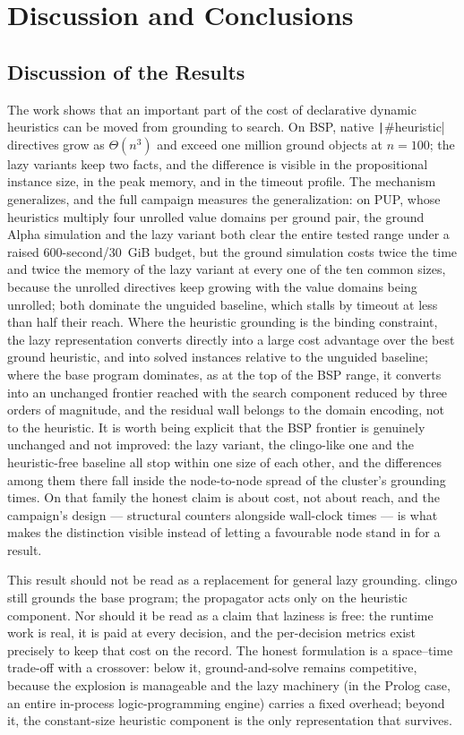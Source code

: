\section{Discussion and Conclusions}
\label{sec:discussion}

\subsection{Discussion of the Results}

The work shows that an important part of the cost of declarative dynamic heuristics can be moved from grounding to search. On BSP, native \texttt|#heuristic| directives grow as $\Theta(n^3)$ and exceed one million ground objects at $n=100$; the lazy variants keep two facts, and the difference is visible in the propositional instance size, in the peak memory, and in the timeout profile. The mechanism generalizes, and the full campaign measures the generalization: on PUP, whose heuristics multiply four unrolled value domains per ground pair, the ground Alpha simulation and the lazy variant both clear the entire tested range under a raised 600-second/30~GiB budget, but the ground simulation costs twice the time and twice the memory of the lazy variant at every one of the ten common sizes, because the unrolled directives keep growing with the value domains being unrolled; both dominate the unguided baseline, which stalls by timeout at less than half their reach. Where the heuristic grounding is the binding constraint, the lazy representation converts directly into a large cost advantage over the best ground heuristic, and into solved instances relative to the unguided baseline; where the base program dominates, as at the top of the BSP range, it converts into an unchanged frontier reached with the search component reduced by three orders of magnitude, and the residual wall belongs to the domain encoding, not to the heuristic. It is worth being explicit that the BSP frontier is genuinely unchanged and not improved: the lazy variant, the clingo-like one and the heuristic-free baseline all stop within one size of each other, and the differences among them there fall inside the node-to-node spread of the cluster's grounding times. On that family the honest claim is about cost, not about reach, and the campaign's design --- structural counters alongside wall-clock times --- is what makes the distinction visible instead of letting a favourable node stand in for a result.

This result should not be read as a replacement for general lazy grounding. clingo still grounds the base program; the propagator acts only on the heuristic component. Nor should it be read as a claim that laziness is free: the runtime work is real, it is paid at every decision, and the per-decision metrics exist precisely to keep that cost on the record. The honest formulation is a space--time trade-off with a crossover: below it, ground-and-solve remains competitive, because the explosion is manageable and the lazy machinery (in the Prolog case, an entire in-process logic-programming engine) carries a fixed overhead; beyond it, the constant-size heuristic component is the only representation that survives.

